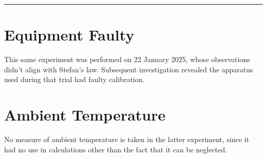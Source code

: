 \documentclass[%
 sor,
 jor,
 amsmath,amssymb,
 reprint,%
]{revtex4-2}
\begin{document}
\noindent\rule{\linewidth}{0.4pt}
\vspace{2cm}
\appendix
\section{Equipment Faulty}\label{appendix:prevexp}
This same experiment was performed on 22 January 2025, whose observations didn't align with Stefan's law. Subsequent investigation revealed the apparatus used during that trial had faulty calibration.
\section{Ambient Temperature}
No measure of ambient temperature is taken in the latter experiment, since it had no use in calculations other than the fact that it can be neglected. 


\end{document}
